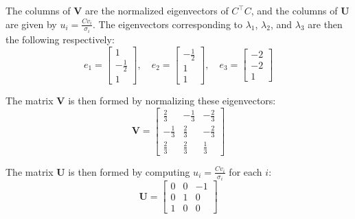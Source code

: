 \begin{homeworkProblem}
\begin{solution}
\begin{itemize}
                The columns of $\mathbf{V}$ are the normalized eigenvectors of 
                $C^\top C$, and the columns of $\mathbf{U}$ are given by $u_i = 
                \frac{Cv_i}{\sigma_i}$. The eigenvectors corresponding to 
                $\lambda_1$, $\lambda_2$, and $\lambda_3$ are then the 
                following respectively:
                \[
                    e_1 = \begin{bmatrix} 1 \\ -\frac{1}{2} \\ 1 \end{bmatrix}, \quad
                    e_2 = \begin{bmatrix} -\frac{1}{2} \\ 1 \\ 1 \end{bmatrix}, \quad
                    e_3 = \begin{bmatrix} -2 \\ -2 \\ 1 \end{bmatrix}
                \]

                The matrix $\mathbf{V}$ is then formed by normalizing these 
                eigenvectors:
                \[
                    \mathbf{V} = \begin{bmatrix}
                        \frac{2}{3} & -\frac{1}{3} & -\frac{2}{3} \\
                        -\frac{1}{3} & \frac{2}{3} & -\frac{2}{3} \\
                        \frac{2}{3} & \frac{2}{3} & \frac{1}{3}
                    \end{bmatrix}
                \]

                The matrix $\mathbf{U}$ is then formed by computing $u_i = 
                \frac{Cv_i}{\sigma_i}$ for each $i$:
                \[
                    \mathbf{U} = \begin{bmatrix}
                        0 & 0 & -1 \\
                        0 & 1 & 0 \\
                        1 & 0 & 0
                    \end{bmatrix}
                \]


\end{itemize}
\end{solution}
\end{homeworkProblem}
